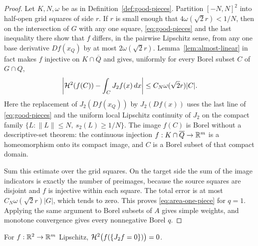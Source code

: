 \begin{proof}
Let $K,N,\omega$ be as in Definition~\ref{def:good-pieces}.  Partition
$[-N,N]^2$ into half-open grid squares of side $r$.  If $r$ is small enough
that $4\omega(\sqrt2r)<1/N$, then on the intersection of $G$ with any one
square, \eqref{eq:good-pieces} and the last inequality there show that $f$
differs, in the pairwise Lipschitz sense, from any one base derivative
$Df(x_Q)$ by at most $2\omega(\sqrt2r)$.  Lemma~\ref{lem:almost-linear} in
fact makes $f$ injective on $K\cap\overline Q$ and gives, uniformly for every
Borel subset $C$ of $G\cap Q$,
\[
 \left|\mathcal H^2(f(C))-\int_CJ_2f(x)\,dx\right|
 \le C_N\omega(\sqrt2r)|C|.
\]
Here the replacement of $J_2(Df(x_Q))$ by $J_2(Df(x))$ uses the last line of
\eqref{eq:good-pieces} and the uniform local Lipschitz continuity of $J_2$ on
the compact family $\{L:\|L\|\le N,\ s_2(L)\ge1/N\}$.
The image $f(C)$ is Borel without a descriptive-set theorem: the continuous
injection $f:K\cap\overline Q\to\mathbb R^m$ is a homeomorphism onto its compact
image, and $C$ is a Borel subset of that compact domain.

Sum this estimate over the grid squares.  On the target side the sum of the
image indicators is exactly the number of preimages, because the source
squares are disjoint and $f$ is injective within each square.  The total
error is at most $C_N\omega(\sqrt2r)|G|$, which tends to zero.  This proves
\eqref{eq:area-one-piece} for $q=1$.  Applying the same argument to Borel
subsets of $A$ gives simple weights, and monotone convergence gives every
nonnegative Borel $q$.
\end{proof}

\begin{lemma}
\label{lem:rank-deficient}
For $f:\mathbb R^2\to\mathbb R^m$ Lipschitz, $\mathcal H^2\bigl(f(\{J_2f=0\})\bigr)=0$.
\end{lemma}

